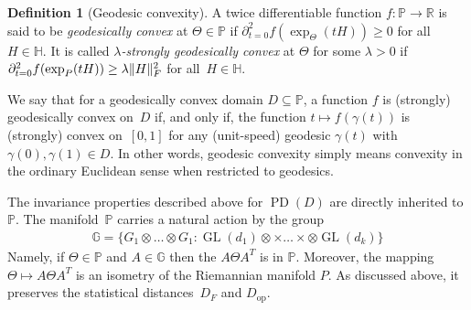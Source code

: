 \documentclass[aos]{imsart}
\theoremstyle{definition}
\newtheorem*{definition}{Definition}
\numberwithin{equation}{section}
\DeclareMathOperator{\op}{op}
\DeclareMathOperator{\GL}{GL}
\DeclareMathOperator{\PD}{PD}
\DeclarePairedDelimiter{\norm}{\lVert}{\rVert}
\newcommand{\R}{{\mathbb{R}}}
\renewcommand{\P}{{\mathbb{P}}}
\renewcommand{\H}{{\mathbb{H}}}
\newcommand{\G}{{\mathbb{G}}}
\newcommand{\ot}{\otimes}
\newcommand{\samp}{x}
\newcommand{\MW}[1]{{\color{red}[MW: #1]}}
\begin{document}
\begin{definition}[Geodesic convexity]
A twice differentiable function $f\colon \P \to \R$ is said to be \emph{geodesically convex} at $\Theta\in\P$ if $\partial^2_{t=0} f(\exp_\Theta(tH)) \geq 0$ for all~$H\in\H$.
It is called \emph{$\lambda$-strongly geodesically convex} at $\Theta$ for some $\lambda>0$ if $\partial^2_{t=0} f(\exp_P(tH)) \geq \lambda \norm H_F^2$ for all~$H\in\H$.

We say that for a geodesically convex domain $D \subseteq \P$, a function $f$ is (strongly) geodesically convex on~$D$ if, and only if, the function $t \mapsto f(\gamma(t))$ is (strongly) convex on~$[0,1]$ for any (unit-speed) geodesic $\gamma(t)$ with $\gamma(0),\gamma(1)\in D$.
In other words, geodesic convexity simply means convexity in the ordinary Euclidean sense when restricted to geodesics.

\end{definition}

The invariance properties described above for $\PD(D)$ are directly inherited to $\P$.
The manifold~$\P$ carries a natural action by the group
\begin{align*}
  \G =  \{G_1 \ot \dots \ot G_1: \GL(d_1)\ot \times \dots \times \ot \GL(d_k)\}
\end{align*}
Namely, if $\Theta \in \P$ and $A \in \G$ then the $A \Theta A^T$ is in $\P$. 
Moreover, the mapping $\Theta \mapsto A\Theta A^T$ is an isometry of the Riemannian manifold $P$. 
As discussed above, it preserves the statistical distances~$D_F$ and $D_{\op}$.

\end{document}
